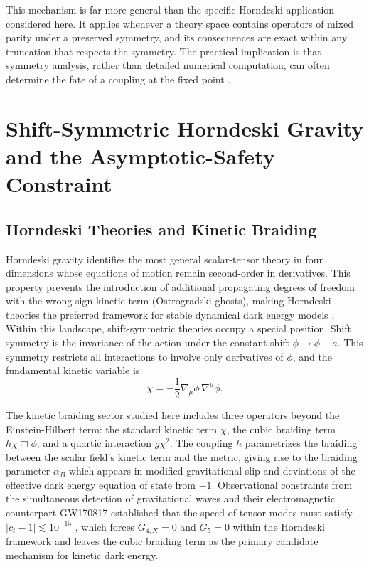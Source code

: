 \documentclass[12pt,a4paper]{article}
\begin{document}
This mechanism is far more general than the specific Horndeski application
considered here. It applies whenever a theory space contains operators of mixed
parity under a preserved symmetry, and its consequences are exact within any
truncation that respects the symmetry. The practical implication is that
symmetry analysis, rather than detailed numerical computation, can often
determine the fate of a coupling at the fixed point \cite{EichhornSchiffer2022handbook}.

\section{Shift-Symmetric Horndeski Gravity and the Asymptotic-Safety Constraint}

\subsection{Horndeski Theories and Kinetic Braiding}

Horndeski gravity \cite{Horndeski1974} identifies the most general scalar-tensor
theory in four dimensions whose equations of motion remain second-order in
derivatives. This property prevents the introduction of additional propagating
degrees of freedom with the wrong sign kinetic term (Ostrogradski ghosts),
making Horndeski theories the preferred framework for stable dynamical dark
energy models \cite{Clifton2012,Nicolis2009}. Within this landscape,
shift-symmetric theories occupy a special position. Shift symmetry is the
invariance of the action under the constant shift $\phi \to \phi + a$. This
symmetry restricts all interactions to involve only derivatives of $\phi$,
and the fundamental kinetic variable is
\begin{equation}
\chi = -\frac{1}{2}\nabla_\mu\phi\,\nabla^\mu\phi.
\end{equation}

The kinetic braiding sector studied here includes three operators beyond the
Einstein-Hilbert term: the standard kinetic term $\chi$, the cubic braiding
term $h\chi\Box\phi$, and a quartic interaction $g\chi^2$. The coupling $h$
parametrizes the braiding between the scalar field's kinetic term and the
metric, giving rise to the braiding parameter $\alpha_B$ which appears in
modified gravitational slip and deviations of the effective dark energy
equation of state from $-1$. Observational constraints from the simultaneous
detection of gravitational waves and their electromagnetic counterpart
GW170817 established that the speed of tensor modes must satisfy
$|c_t - 1| \lesssim 10^{-15}$ \cite{Abbott2016}, which forces $G_{4,X} = 0$
and $G_5 = 0$ within the Horndeski framework and leaves the cubic braiding
term as the primary candidate mechanism for kinetic dark energy.
\end{document}
